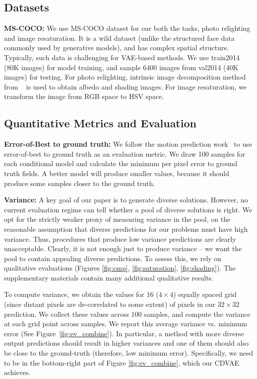 \documentclass[10pt,twocolumn,letterpaper]{article}
\begin{document}
\subsection{Datasets}
\label{sec:data}

\textbf{MS-COCO: } We use MS-COCO dataset for our both the tasks, photo relighting and image resaturation. It is a wild 
dataset (unlike the structured face data commonly used by generative models), and has complex spatial structure. 
Typically, such data is challenging for VAE-based methods. We use train2014 (80K images) for model training, and 
sample 6400 images from val2014 (40K images) for testing. For photo relighting, intrinsic image decomposition method from ~\cite{Bell:2014} 
is used to obtain albedo and shading images. For image resaturation, we transform the image from RGB space to HSV space. 

\subsection{Quantitative Metrics and Evaluation}
\label{sec:quant}


\textbf{Error-of-Best to ground truth:} We follow the motion prediction work~\cite{walker2016uncertain} to use 
error-of-best to ground truth as an evaluation metric. We draw 100 samples for each conditional model and calculate 
the minimum per pixel error to ground truth fields. A better model will produce smaller values, because it 
should produce some samples closer to the ground truth.

\textbf{Variance:} 
A key goal of our paper is to generate diverse solutions. However, no current evaluation regime can tell 
whether a pool of diverse solutions is right. We opt for the strictly weaker proxy of measuring variance
in the pool, on the reasonable assumption that diverse predictions for our problems must have high variance.
Thus, procedures that produce low variance predictions are clearly unacceptable. Clearly, it is not enough
just to produce variance -- we want the pool to contain appealing diverse predictions. To assess this, 
we rely on qualitative evaluations (Figures \ref{fig:cmp}, \ref{fig:saturation}, \ref{fig:shading}).
The supplementary materials contain many additional qualitative results.

To compute variance, we obtain the values for 16 ($4 \times 4$) equally spaced grid 
(since distant pixels are de-correlated to some extent) of pixels in our $32 \times 32$ 
prediction. We collect these values across 100 samples, and compute the variance at 
each grid point across samples. We report this average variance vs. minimum error 
(See Figure~\ref{fig:ev_combine}). In particular, a method with more diverse output 
predictions should result in higher variances and one of them should also be close
to the ground-truth (therefore, low minimum error). Specifically, we need to be in
the bottom-right part of Figure \ref{fig:ev_combine}, which our CDVAE achieves.
 
\end{document}
